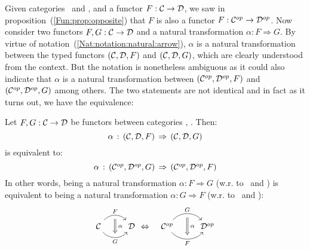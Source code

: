 Given categories \Cat\ and \Dat, and a functor $F:\mbox{$\cal C$}\to\mbox{$\cal D$}$, we saw
in proposition~(\ref{Fun:prop:opposite}) that $F$ is also a functor 
$F:\mbox{${\cal C}^{op}$}\to\mbox{${\cal D}^{op}$}$. Now consider two functors $F,G:\mbox{$\cal C$}\to\mbox{$\cal D$}$ and a natural 
transformation $\alpha:F \Rightarrow G$. By virtue of 
notation~(\ref{Nat:notation:natural:arrow}), $\alpha$ is a natural 
transformation between the typed functors $(\mbox{$\cal C$},\mbox{$\cal D$},F)$ and $(\mbox{$\cal C$},\mbox{$\cal D$},G)$, 
which are clearly understood from the context. But the notation is nonetheless 
ambiguous as it could also indicate that $\alpha$ is a natural
transformation between $(\mbox{${\cal C}^{op}$},\mbox{${\cal D}^{op}$},F)$ and $(\mbox{${\cal C}^{op}$},\mbox{${\cal D}^{op}$},G)$ among others. 
The two statements are not identical and in fact as it turns out, we
have the equivalence:

\begin{prop}
    Let $F,G:\mbox{$\cal C$}\to\mbox{$\cal D$}$ be functors between categories \Cat, \Dat. Then: 
    \[
        \alpha\,:\,(\mbox{$\cal C$},\mbox{$\cal D$},F)\,\Rightarrow\,(\mbox{$\cal C$},\mbox{$\cal D$},G)
    \]
    is equivalent to:
    \[
        \alpha\,:\,(\mbox{${\cal C}^{op}$},\mbox{${\cal D}^{op}$},G)\,\Rightarrow\,(\mbox{${\cal C}^{op}$},\mbox{${\cal D}^{op}$},F)
    \]
    In other words, being a natural transformation $\alpha:F\Rightarrow G$ (w.r.
    to \Cat\ and \Dat) is equivalent to being a natural transformation 
    $\alpha:G\Rightarrow F$ (w.r. to \Cop\ and \Dop):
    \begin{eqnarray}
        \begin{tikzcd}
            \Cat \arrow[r, "F", bend left  = 50, ""{name=U, below}]
                 \arrow[r, swap, "G", bend right = 50, ""{name=D, above}]
              & \Dat
            \arrow[Rightarrow, "\,\alpha", from = U, to = D]
        \end{tikzcd}
        &\Leftrightarrow&
        \begin{tikzcd}
            \Cop \arrow[r, "G", bend left  = 50, ""{name=U, below}]
                 \arrow[r, swap, "F", bend right = 50, ""{name=D, above}]
              & \Dop
            \arrow[Rightarrow, "\,\alpha", from = U, to = D]
        \end{tikzcd}
    \end{eqnarray}
\end{prop}
